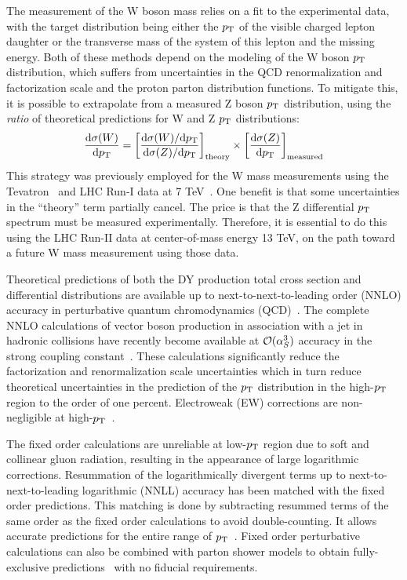 The measurement of the W boson mass relies on a fit to the experimental data, with the
target distribution being either the $p_{\mathrm{T}}$ of the visible charged lepton daughter
or the transverse mass of the system of this lepton and the missing energy.
Both of these methods depend on the modeling of the W boson $p_{\mathrm{T}}$ distribution,
which suffers from uncertainties in the QCD renormalization and factorization scale and the proton parton distribution functions.
To mitigate this, it is possible to extrapolate from a measured Z boson $p_{\mathrm{T}}$ distribution, using
the \textit{ratio} of theoretical predictions for W and Z $p_{\mathrm{T}}$ distributions:
\begin{equation}
\frac{\mathrm{d}\sigma(W)}{\mathrm{d} p_{\mathrm{T}}} = \left[ \frac{\mathrm{d}\sigma(W)/\mathrm{d}p_{\mathrm{T}} }{\mathrm{d}\sigma(Z)/\mathrm{d} p_{\mathrm{T}} } \right]_\mathrm{theory} \times \left[ \frac{\mathrm{d}\sigma(Z)}{\mathrm{d} p_{\mathrm{T}}} \right]_\mathrm{measured}
\end{equation}
This strategy was previously employed for the W mass measurements using the Tevatron~\cite{Abazov:2012bv,Aaltonen:2012bp} and LHC Run-I data at 7 TeV~\cite{Aaboud:2017svj}.
One benefit is that some uncertainties in the ``theory'' term partially cancel.
The price is that the Z differential $p_{\mathrm{T}}$ spectrum must be measured experimentally.
Therefore, it is essential to do this using the LHC Run-II data at center-of-mass energy 13 TeV,
on the path toward a future W mass measurement using those data.
      
Theoretical predictions of both the DY production total cross section and 
differential distributions are available up to next-to-next-to-leading order 
(NNLO) accuracy in perturbative quantum chromodynamics 
(QCD)~\cite{Melnikov:2006kv,Catani:2009sm}. The complete NNLO calculations of 
vector boson production in association with a jet in hadronic collisions have 
recently become available at $\mathcal{O}(\alpha_S^3)$ accuracy in the strong 
coupling constant~\cite{Ridder:2015dxa,Boughezal:2015ded,Boughezal:2015dva}. 
These calculations significantly reduce the factorization and renormalization scale 
uncertainties which in turn reduce theoretical uncertainties in the prediction 
of the $p_{\mathrm{T}}$ distribution in the high-$p_{\mathrm{T}}$ region to the order of one 
percent. Electroweak (EW) corrections are non-negligible at 
high-$p_{\mathrm{T}}$~\cite{Dittmaier:2014qza,Lindert:2017olm}.      

The fixed order calculations are unreliable at low-$p_{\mathrm{T}}$ region due to soft 
and collinear gluon radiation, resulting in the appearance of large logarithmic 
corrections.
Resummation of the logarithmically divergent terms up to next-to-next-to-leading logarithmic (NNLL) accuracy has been matched with the fixed order predictions.
This matching is done by subtracting resummed terms of the same order as the fixed order calculations to avoid double-counting.
It allows accurate predictions for the entire range of $p_{\mathrm{T}}$~\cite{Balazs:1995nz,Catani:2015vma}.
Fixed order perturbative calculations can also be combined with parton shower models to obtain 
fully-exclusive predictions~\cite{MCatNLO,Nason:2004rx,Frixione:2002ik,Alioli:2010xd} with
no fiducial requirements.      

